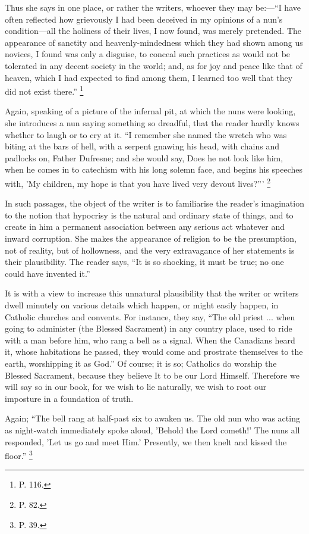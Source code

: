 Thus she says in one place, or rather the writers,
whoever they may be:—``I have often reflected
how grievously I had been deceived in my opinions of a
nun's condition—all the holiness of their lives, I
now found, was merely pretended. The appearance of sanctity and heavenly-mindedness which they had shown
among us novices, I found was only a disguise, to conceal
such practices as would not be tolerated in any decent
society in the world; and, as for joy and peace like that
of heaven, which I had expected to find among them, I
learned too well that they did not exist there.'' \footnote{P. 116.}

Again, speaking of a picture of the infernal pit, at
which the nuns were looking, she introduces a nun saying
something so dreadful, that the reader hardly knows
whether to laugh or to cry at it. ``I remember she
named the wretch who was biting at the bars of hell, with
a serpent gnawing his head, with chains and padlocks on,
Father Dufresne; and she would say, Does he not look like
him, when he comes in to catechism with his long solemn
face, and begins his speeches with, 'My children, my hope
is that you have lived very devout lives?''' \footnote{P. 82.}

In such passages, the object of the writer is to
familiarise the reader's imagination to the notion that
hypocrisy is the natural and ordinary state of things,
and to create in him a permanent association between any
serious act whatever and inward corruption. She makes the
appearance of religion to be the presumption, not of
reality, but of hollowness, and the very extravagance of
her statements is their plausibility. The reader says,
``It is so shocking, it must be true; no one could
have invented it.''

It is with a view to increase this unnatural
plausibility that the writer or writers dwell minutely on
various details which happen, or might easily happen, in
Catholic churches and convents. For instance, they say,
``The old priest ... when going to administer (the
Blessed Sacrament) in any country place, used to ride
with a man before him, who rang a bell as a signal. When
the Canadians heard it, whose habitations he passed, they
would come and prostrate themselves to the earth,
worshipping it as God.'' Of course; it is so;
Catholics do worship the Blessed Sacrament, because they
believe It to be our Lord Himself. Therefore we will say
so in our book, for we wish to lie naturally, we wish to
root our imposture in a foundation of truth.

Again; ``The bell rang at half-past six to awaken
us. The old nun who was acting as night-watch immediately
spoke aloud, 'Behold the Lord cometh!' The nuns all
responded, 'Let us go and meet Him.' Presently, we then
knelt and kissed the floor.'' \footnote{P. 39.}

